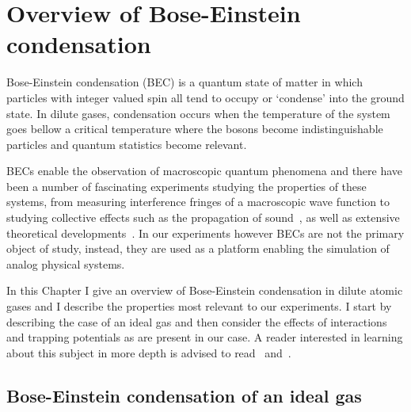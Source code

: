 
\renewcommand{\thechapter}{2}

\chapter{Overview of Bose-Einstein condensation}
\label{ch:BECs}

Bose-Einstein condensation (BEC) is a quantum state of matter in which particles with integer valued spin all tend to occupy or `condense' into the ground state. In dilute gases, condensation occurs when the temperature of the system goes bellow a critical temperature where the bosons become indistinguishable particles and quantum statistics become relevant. 

BECs enable the observation of macroscopic quantum phenomena and there have been a number of fascinating experiments studying the properties of these systems, from measuring interference fringes of a macroscopic wave function to studying collective effects such as the propagation of sound~\cite{ketterle_w._making_1999}, as well as extensive theoretical developments~\cite{dalfovo_theory_1999}. In our experiments however BECs are not the primary object of study, instead, they are used as a platform enabling the simulation of analog physical systems. 

In this Chapter I give an overview of Bose-Einstein condensation in dilute atomic gases and I describe the properties most relevant to our experiments. I start by describing the case of an ideal gas and then consider the effects of interactions and trapping potentials as are present in our case. A reader interested in learning about this subject in more depth is advised to read~\cite{Pethick} and~\cite{noauthor_bose-einstein_2003}.

\section{Bose-Einstein condensation of an ideal gas}


